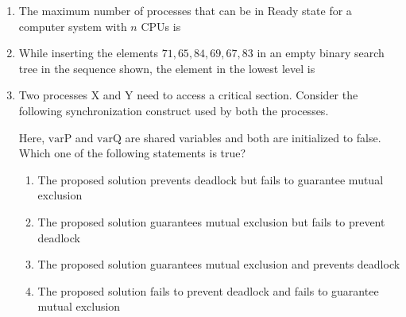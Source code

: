 \documentclass[journal,12pt,onecolumn]{IEEEtran}
\theoremstyle{remark}
\begin{document}
\begin{enumerate}
				\item The maximum number of processes that can be in Ready state for a computer system with $n$ CPUs is
				
				\hfill{}
				
				\begin{enumerate}
				\end{enumerate}
				
				\item While inserting the elements $71,65,84,69,67,83$ in an empty binary search tree  in the sequence shown, the element in the lowest level is
				
				\hfill{\brak{\text{GATE CS 2015}}}
				
				\begin{enumerate}
					\begin{multicols}{4}
						\item $65$
						\item $67$
						\item $69$
						\item $83$
					\end{multicols}
				\end{enumerate}
				
				\item Two processes X and Y need to access a critical section. Consider the following synchronization construct used by both the processes.
				
				
				\hfill{}
				
				Here, $\text{varP}$ and $\text{varQ}$ are shared variables and both are initialized to false. Which one of the following statements is true?
				
				\begin{enumerate}
					\item The proposed solution prevents deadlock but fails to guarantee mutual exclusion
					\item The proposed solution guarantees mutual exclusion but fails to prevent deadlock
					\item The proposed solution guarantees mutual exclusion and prevents deadlock
					\item The proposed solution fails to prevent deadlock and fails to guarantee mutual exclusion
				\end{enumerate}
				

\end{enumerate}
\end{document}
